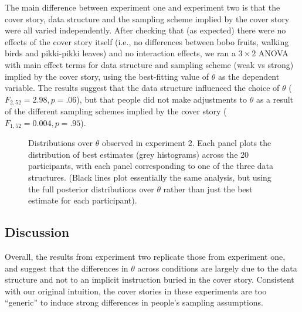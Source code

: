 \documentclass[doc]{apa6}
\begin{document}
The main difference between experiment one and experiment two is that the cover story, data structure and the sampling scheme implied by the cover story were all varied independently. After checking that (as expected) there were no effects of the cover story itself (i.e., no differences between bobo fruits, walking birds and pikki-pikki leaves) and no interaction effects, we ran a $3 \times 2$ ANOVA with main effect terms for data structure and sampling scheme (weak vs strong) implied by the cover story, using the best-fitting value of $\theta$ as the dependent variable. The results suggest that the data structure influenced the choice of $\theta$ ($F_{2,52}=2.98, p = .06$), but that people did not make adjustments to $\theta$ as a result of the different sampling schemes implied by the cover story  ($F_{1,52}=0.004, p = .95$).

\begin{figure}[t]
\begin{center}
\caption{Distributions over $\theta$ observed in experiment 2. Each panel plots the distribution of best estimates (grey histograms) across the 20 participants, with each panel corresponding to one of the three data structures. (Black lines plot essentially the same analysis, but using the full posterior distributions over $\theta$ rather than just the best estimate for each participant).}
\label{margpost2}
\end{center}
\end{figure}

\subsection{Discussion}

Overall, the results from experiment two replicate those from experiment one, and suggest that the differences in $\theta$ across conditions are largely due to the data structure and not to an implicit instruction buried in the cover story. Consistent with our original intuition, the cover stories in these experiments are too ``generic'' to induce strong differences in people's sampling assumptions.
\end{document}
